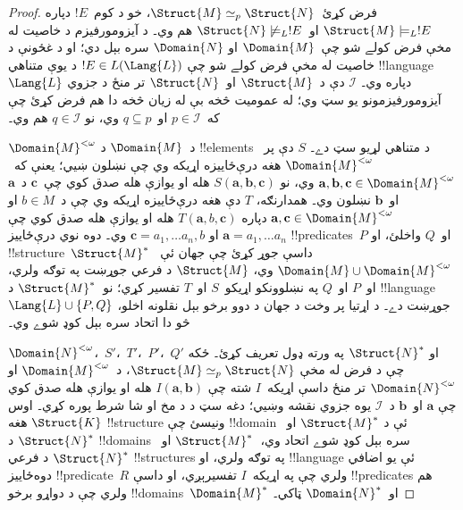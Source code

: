 \documentclass[../../../include/open-logic-section]{subfiles}
\begin{document}
\begin{proof}
فرض کړئ~$\Struct{M} \simeq_p \Struct{N}$، خو د کوم~$!E$ دپاره
$\Struct{M} \models_L !E$ او~$\Struct{N} \not\models_L !E$ هم وي۔ د
آيزومورفيزم د خاصيت له مخې فرض کولے شو چې~$\Domain{M}$ او
$\Domain{N}$ سره بېل دي؛ او د غځونې د خاصيت له مخې فرض کولے شو چې
$!E \in L(\Lang{L})$ د يوې متناهي !!{language}~$\Lang{L}$ دپاره
وي۔ $\mathcal{I}$ دې د~$\Struct{M}$ او~$\Struct{N}$ تر منځ د جزوي
آيزومورفيزمونو يو سټ وي؛ له عموميت څخه بې له زيان څخه دا هم فرض کړئ
چې که~$p \in \mathcal{I}$ او~$q \subseteq p$ وي، نو
$q \in \mathcal{I}$ هم وي۔

$\Domain{M}^{<\omega}$ د~$\Domain{M}$ د !!{element}s د متناهي لړيو
سټ دے۔ $S$ دې پر~$\Domain{M}^{<\omega}$ هغه درې‌ځاييزه اړيکه وي چې
نښلون ښيي؛ يعنې که~$\mathbf{a}, \mathbf{b},
\mathbf{c} \in \Domain{M}^{<\omega}$ وي، نو
$S(\mathbf{a}, \mathbf{b}, \mathbf{c})$ هله او يوازې هله صدق کوي
چې~$\mathbf{c}$ د~$\mathbf{a}$ او~$\mathbf{b}$ نښلون وي۔ همدارنګه،
$T$ دې هغه درې‌ځاييزه اړيکه وي چې د~$b \in M$ او
$\mathbf{a}, \mathbf{c} \in \Domain{M}^{<\omega}$ دپاره
$T(\mathbf{a}, b, \mathbf{c})$ هله او يوازې هله صدق کوي چې
$\mathbf{a} = a_1, \dots a_n$ او
$\mathbf{c} = a_1, \dots a_n, b$ وي۔ دوه نوي درې‌ځاييز
!!{predicate}s~$P$ او~$Q$ واخلئ، او !!{structure}~$\Struct{M}^*$
داسې جوړ کړئ چې جهان ئې~$\Domain{M} \cup \Domain{M}^{<\omega}$ وي،
$\Struct{M}$ د فرعي جوړښت په توګه ولري، او~$P$ او~$Q$ په نښلوونکو
اړيکو~$S$ او~$T$ تفسير کړي؛ نو~$\Struct{M}^*$ د
!!{language}~$\Lang{L} \cup \{ P, Q\}$ جوړښت دے۔ د اړتيا پر وخت د
جهان د دوو برخو بېل نقلونه اخلو، څو دا اتحاد سره بېل کوډ شوے وي۔

$\Domain{N}^{<\omega}$،~$S'$،~$T'$،~$P'$،~$Q'$ او
$\Struct{N}^*$ په ورته ډول تعريف کړئ۔ ځکه چې د فرض له مخې
$\Struct{M} \simeq_p \Struct{N}$، د~$\Domain{M}^{<\omega}$ او
$\Domain{N}^{<\omega}$ تر منځ داسې اړيکه~$I$ شته چې
$I(\mathbf{a}, \mathbf{b})$ هله او يوازې هله صدق کوي چې
$\mathbf{a}$ او~$\mathbf{b}$ د~$\mathcal{I}$ يوه جزوي نقشه وښيي؛ دغه سټ د
 د مخ او شا شرط پوره کړي۔ اوس
$\Struct{K}$ هغه !!{structure} ونيسئ چې !!{domain} ئې د
$\Struct{M}^*$ او~$\Struct{N}^*$ د !!{domain}s سره بېل کوډ شوے اتحاد
وي،~$\Struct{M}^*$ او~$\Struct{N}^*$ د فرعي !!{structure}s په توګه
ولري، او !!{language} ئې يو اضافي دوه‌ځاييز !!{predicate}~$R$ ولري چې په
اړيکه~$I$ تفسيرېږي، او داسې !!{predicate}s هم ولري چې د دواړو برخو
!!{domain}s~$\Domain{M}^*$ او~$\Domain{N}^*$ ټاکي۔


\end{proof}
\end{document}
